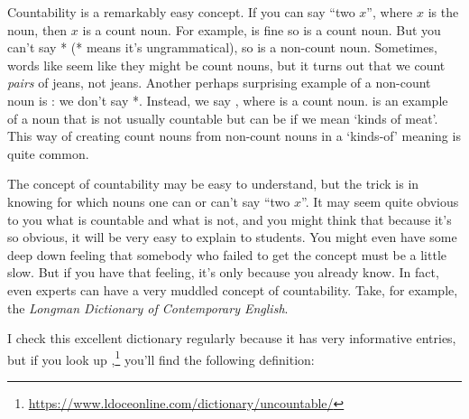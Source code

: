 Countability is a remarkably easy concept. If you can say \enquote{two $x$}, where $x$ is the noun, then $x$ is a count noun. For example,  is fine so  is a count noun. But you can't say * (* means it's ungrammatical), so  is a non-count noun. Sometimes, words like  seem like they might be count nouns, but it turns out that we count \emph{pairs} of jeans, not jeans. Another perhaps surprising example of a non-count noun is : we don't say *. Instead, we say , where  is a count noun.  is an example of a noun that is not usually countable but can be if we mean `kinds of meat'. This way of creating count nouns from non-count nouns in a `kinds-of' meaning is quite common.

The concept of countability may be easy to understand, but the trick is in knowing for which nouns one can or can't say \enquote{two $x$}. It may seem quite obvious to you what is countable and what is not, and you might think that because it's so obvious, it will be very easy to explain to students. You might even have some deep down feeling that somebody who failed to get the concept must be a little slow. But if you have that feeling, it's only because you already know. In fact, even experts can have a very muddled concept of countability. Take, for example, the \textit{Longman Dictionary of Contemporary English}.

I check this excellent dictionary regularly because it has very informative entries, but if you look up ,\footnote{\url{https://www.ldoceonline.com/dictionary/uncountable/}} you'll find the following definition:


